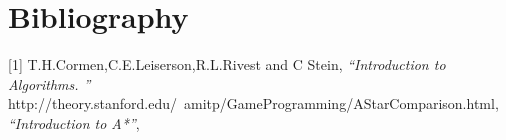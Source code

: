\documentclass[14pt,a4]{extreport}
\begin{document}
\section* {Bibliography}
[1] T.H.Cormen,C.E.Leiserson,R.L.Rivest and C Stein, \textit{\enquote{Introduction to Algorithms. }}\\ \relax
[2] http://theory.stanford.edu/~amitp/GameProgramming/AStarComparison.html, \textit{\enquote{Introduction to A*}},\\ \relax


 
\end{document}
